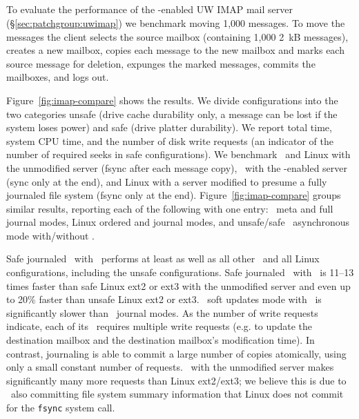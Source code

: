\subsection {\Patchgroups}
\label{sec:evaluation:uwimap}


To evaluate the performance of the \patchgroup-enabled UW IMAP mail
server (\S\ref{sec:patchgroup:uwimap}) we benchmark moving 1,000
messages.
%
To move the messages the client selects the source mailbox (containing
1,000 2~kB messages), creates a new mailbox, copies each message to
the new mailbox and marks each source message for deletion, expunges
the marked messages, commits the mailboxes, and logs out.

Figure~\ref{fig:imap-compare} shows the results.
%
We divide configurations into the two categories unsafe (drive cache
durability only, a message can be lost if the system loses power) and safe
(drive platter durability).
%
We report total time, system CPU time, and the number of disk write
requests (an indicator of the number of required seeks in safe
configurations).
%
We benchmark
%
\Kudos\ and Linux with the unmodified server (fsync after each message
copy),
%
\Kudos\ with the \patchgroup-enabled server (sync only at the end),
%
and Linux with a server modified to presume a fully journaled file
system (fsync only at the end).
%
Figure~\ref{fig:imap-compare} groups similar results, reporting each
of the following with one entry:
%
\Kudos\ meta and full journal modes,
%
Linux ordered and journal modes,
%
and unsafe/safe \Kudos\ asynchronous mode with/without \patchgroups.

Safe journaled \Kudos\ with \patchgroups\ performs at least as well as
all other \Kudos\ and all Linux configurations, including the unsafe
configurations. Safe journaled \Kudos\ with \patchgroups\ is 11--13
times faster than safe Linux ext2 or ext3 with the unmodified server
and even up to 20\% faster than unsafe Linux ext2 or ext3.
%
\Kudos\ soft updates mode with \patchgroups\ is significantly slower
than \Kudos\ journal modes. As the number of write requests indicate,
each of its \patchgroups\ requires multiple write requests (e.g. to
update the destination mailbox and the destination mailbox's
modification time). In contrast, journaling is able to commit a large
number of copies atomically, using only a small constant number of
requests.
%
\Kudos\ with the unmodified server makes significantly many more
requests than Linux ext2/ext3; we believe this is due to \Kudos\ also
committing file system summary information that Linux does not commit
for the \texttt{fsync} system call.
%

